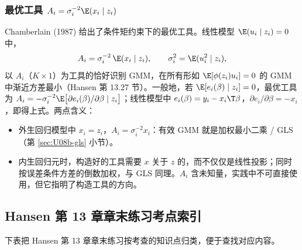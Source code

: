 \subsubsection{最优工具 \texorpdfstring{$A_i=\sigma_i^{-2}\E(x_i\mid z_i)$}{A = sigma-2 E(x|z)}}

Chamberlain (1987) 给出了条件矩约束下的最优工具。线性模型 $\E(u_i\mid z_i)=0$ 中，
\[
A_i=\sigma_i^{-2}\,\E(x_i\mid z_i),\qquad \sigma_i^2=\E(u_i^2\mid z_i),
\]
以 $A_i$（$K\times1$）为工具的恰好识别 GMM，在所有形如 $\E[\phi(z_i)u_i]=0$ 的 GMM 中渐近方差最小（Hansen 第 13.27 节）。一般地，若 $\E[e_i(\beta)\mid z_i]=0$，最优工具为 $A_i=-\sigma_i^{-2}\E\big[\partial e_i(\beta)/\partial\beta\mid z_i\big]$；线性模型中 $e_i(\beta)=y_i-x_i\T\beta$，$\partial e_i/\partial\beta=-x_i$，即得上式。两点含义：
\begin{itemize}
  \item 外生回归模型中 $x_i=z_i$，$A_i=\sigma_i^{-2}x_i$：有效 GMM 就是加权最小二乘 / GLS（第 \ref{sec:U08b-gls} 小节）。
  \item 内生回归元时，构造好的工具需要 $x$ 关于 $z$ 的，而不仅仅是线性投影；同时按误差条件方差的倒数加权，与 GLS 同理。$A_i$ 含未知量，实践中不可直接使用，但它指明了构造工具的方向。
\end{itemize}

\subsection{Hansen 第 13 章章末练习考点索引}\label{sec:U08b-hansenidx}

下表把 Hansen 第 13 章章末练习按考查的知识点归类，便于查找对应内容。

